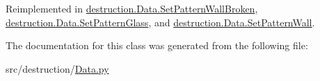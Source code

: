 Reimplemented in \hyperlink{classdestruction_1_1_data_1_1_set_pattern_wall_broken_a5f84b25f2b6a62a46744c582770d2bdd}{destruction.\-Data.\-Set\-Pattern\-Wall\-Broken}, \hyperlink{classdestruction_1_1_data_1_1_set_pattern_glass_aa0dc352d65a35f22afccb81e831cba5c}{destruction.\-Data.\-Set\-Pattern\-Glass}, and \hyperlink{classdestruction_1_1_data_1_1_set_pattern_wall_a08fb832131481a26aa4d6d4ed43f9382}{destruction.\-Data.\-Set\-Pattern\-Wall}.



The documentation for this class was generated from the following file\-:\begin{DoxyCompactItemize}
\item 
src/destruction/\hyperlink{_data_8py}{Data.\-py}\end{DoxyCompactItemize}
